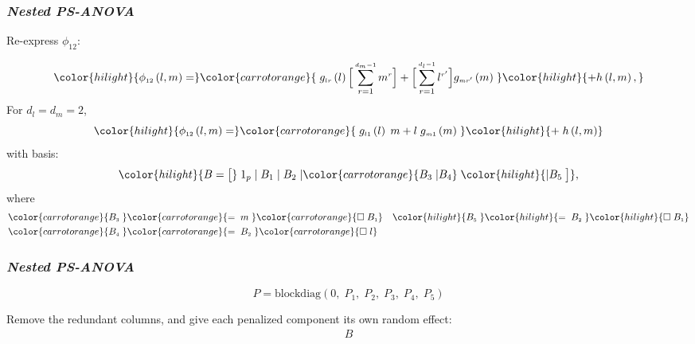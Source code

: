 \documentclass[12pt]{beamer}
\newcommand{\newmaththought}[1]{{ \color{hilight} {#1}}}
\newcommand{\carrotorangemath}[1]{{ \color{carrotorange} {#1}}}
\newcommand{\ms}{\scriptscriptstyle}
\begin{document}


\begin{frame}
\frametitle{\emph{Nested PS-ANOVA}}

Re-express $\phi_{\ms{12}}$:

\begin{align*}
\newmaththought{ \phi_{\ms{12}}\left(l,m\right)  =} \carrotorangemath{\; g_{\ms lr}\left(l\right) \Big[ \sum_{r=1}^{\ms{d_m-1}} m^{\ms r}\Big] + \Big[ \sum_{r=1}^{\ms{d_l-1}} l^{\ms r^\prime} \Big] g_{\ms mr^\prime}\left(m\right)\;}  \newmaththought{+ h\left( l,m \right), } 
\end{align*}
\noindent
For $d_l = d_m = 2$,
\[
\newmaththought{ \phi_{\ms{12}}\left(l,m\right)  =} \carrotorangemath{\; g_{\ms l1}\left(l\right) \; m+ l \; g_{\ms m1}\left(m\right)\;}\newmaththought{ + \; h\left( l,m \right) } 
\]
with basis:
\begin{equation} \label{eq:nested-SANOVA-basis-matrix}
\color{hilight}{B = \big[ } \; 1_p \; \vert \;  B_1  \; \vert \;   B_2 \; \vert \carrotorangemath{ B_3 \; \vert B_4 }\;\newmaththought{ \vert B_5 \; \big]},
\end{equation}
\noindent
where
\begin{align*}
\carrotorangemath{B_{\ms 3}\;} &\carrotorangemath{= \;m \;} \carrotorangemath{ \square \;  B_{\ms 1}}  &  \newmaththought{B_{\ms 5}\;}\newmaththought{=\; B_{\ms 2} \;} \newmaththought{ \square \; B_{\ms 1} } \\
 \carrotorangemath{B_{\ms 4}\;}&\carrotorangemath{=\; B_{\ms 2} \;} \carrotorangemath{ \square \; l } &
\end{align*}


\end{frame}






\begin{frame}
\frametitle{\emph{Nested PS-ANOVA}}

\begin{equation*}
P = \mbox{blockdiag}\left(0,\;P_1,\;P_2,\;P_3,\;P_4,\;P_5\right)
\end{equation*}


Remove the redundant columns, and give each penalized component its own random effect:
\begin{align*}
B
\end{align*}


\end{frame}
\end{document}
